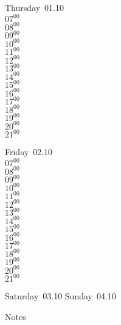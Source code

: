 \documentclass[11pt,a4paper]{book}\usepackage[]{graphicx}\usepackage[]{color}
\begin{document}
\clearpage
\begin{headerbox}
\end{headerbox}
\begin{weekdaybox}
  Thursday~01.10\\
  { 
  \vfill
  $07^{00}$\\
$08^{00}$\\
$09^{00}$\\
$10^{00}$\\
$11^{00}$\\
$12^{00}$\\
$13^{00}$\\
$14^{00}$\\
$15^{00}$\\
$16^{00}$\\
$17^{00}$\\
$18^{00}$\\
$19^{00}$\\
$20^{00}$\\
$21^{00}$\\
  }
\end{weekdaybox} 
\begin{weekdaybox}
  Friday~02.10\\
  { 
  \vfill
  $07^{00}$\\
$08^{00}$\\
$09^{00}$\\
$10^{00}$\\
$11^{00}$\\
$12^{00}$\\
$13^{00}$\\
$14^{00}$\\
$15^{00}$\\
$16^{00}$\\
$17^{00}$\\
$18^{00}$\\
$19^{00}$\\
$20^{00}$\\
$21^{00}$\\
  }
\end{weekdaybox}
\begin{weekendbox}
  Saturday~03.10
  \tcblower
  Sunday~04.10
\end{weekendbox} %
\begin{notebox}
  Notes
\end{notebox}
\clearpage
\end{document}
